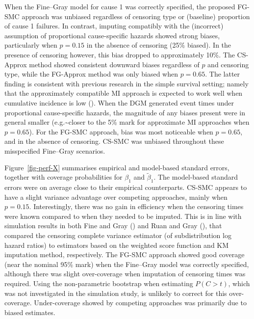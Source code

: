 \documentclass[
  letterpaper,
  paper=240mm:170mm,
  twoside=true,
  open=right,
  fontsize=10pt,
  pagesize=false,
  BCOR=15mm,
  DIV=14,
  headinclude=true,
  footinclude=false,
  headsepline=on]{scrbook}
\begin{document}
When the Fine--Gray model for cause 1 was correctly specified, the
proposed FG-SMC approach was unbiased regardless of censoring type or
(baseline) proportion of cause 1 failures. In contrast, imputing
compatibly with the (incorrect) assumption of proportional
cause-specific hazards showed strong biases, particularly when
\(p = 0.15\) in the absence of censoring (25\% biased). In the presence
of censoring however, this bias dropped to approximately 10\%. The
CS-Approx method showed consistent downward biases regardless of \(p\)
and censoring type, while the FG-Approx method was only biased when
\(p = 0.65\). The latter finding is consistent with previous research in
the simple survival setting; namely that the approximately compatible MI
approach is expected to work well when cumulative incidence is low
(). When the DGM generated event times under proportional
cause-specific hazards, the magnitude of any biases present were in
general smaller (e.g.\textasciitilde closer to the 5\% mark for
approximate MI approaches when \(p = 0.65\)). For the FG-SMC approach,
bias was most noticeable when \(p = 0.65\), and in the absence of
censoring. CS-SMC was unbiased throughout these misspecified Fine--Gray
scenarios.

Figure~\ref{fig-perf-X} summarises empirical and model-based standard
errors, together with coverage probabilities for \(\beta_1\) and
\(\tilde{\beta}_1\). The model-based standard errors were on average
close to their empirical counterparts. CS-SMC appears to have a slight
variance advantage over competing approaches, mainly when \(p = 0.15\).
Interestingly, there was no gain in efficiency when the censoring times
were known compared to when they needed to be imputed. This is in line
with simulation results in both Fine and Gray
() and Ruan and
Gray (), that
compared the censoring complete variance estimator (of subdistribution
log hazard ratios) to estimators based on the weighted score function
and KM imputation method, respectively. The FG-SMC approach showed good
coverage (near the nominal 95\% mark) when the Fine--Gray model was
correctly specified, although there was slight over-coverage when
imputation of censoring times was required. Using the non-parametric
bootstrap when estimating \(P(C > t)\), which was not investigated in
the simulation study, is unlikely to correct for this over-coverage.
Under-coverage showed by competing approaches was primarily due to
biased estimates.
\end{document}
